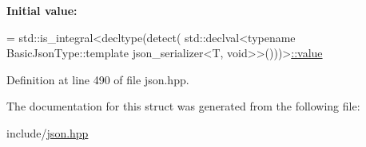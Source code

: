 {\bfseries Initial value\+:}
\begin{DoxyCode}
= std::is\_integral<decltype(detect(
                                      std::declval<\textcolor{keyword}{typename} BasicJsonType::template json\_serializer<T,
       void>>()))>\hyperlink{structnlohmann_1_1detail_1_1has__to__json_a18e260c3c6f10328637c4427d3cb3a31}{::value}
\end{DoxyCode}


Definition at line 490 of file json.\+hpp.



The documentation for this struct was generated from the following file\+:\begin{DoxyCompactItemize}
\item 
include/\hyperlink{json_8hpp}{json.\+hpp}\end{DoxyCompactItemize}
